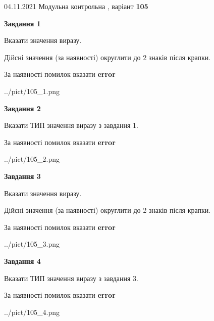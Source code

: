 \documentclass[11pt, ukrainian]{article}
\begin{document}
{04.11.2021 Модульна контрольна , варіант  \No \textbf { 105 }\par}
{
\begin {large}
{\begin {center}\textbf{Завдання 1}\end {center}}\par
Вказати значення виразу. \par
Дійсні значення (за наявності) округлити до 2 знаків після крапки. \par
За наявності помилок вказати \textbf{error}

\begin{center}
	{../pict/105_1.png}
\end{center}
\newpage

{\begin {center}\textbf{Завдання 2}\end {center}}\par
Вказати ТИП значення виразу з завдання 1. \par
За наявності помилок вказати \textbf{error}

\begin{center}
	{../pict/105_2.png}
\end{center}
\newpage

{\begin {center}\textbf{Завдання 3}\end {center}}\par
Вказати значення виразу. \par
Дійсні значення (за наявності) округлити до 2 знаків після крапки. \par
За наявності помилок вказати \textbf{error}

\begin{center}
	{../pict/105_3.png}
\end{center}
\newpage

{\begin {center}\textbf{Завдання 4}\end {center}}\par
Вказати ТИП значення виразу з завдання 3. \par
За наявності помилок вказати \textbf{error}

\begin{center}
	{../pict/105_4.png}
\end{center}
\newpage


\end{large}}
\end{document}
